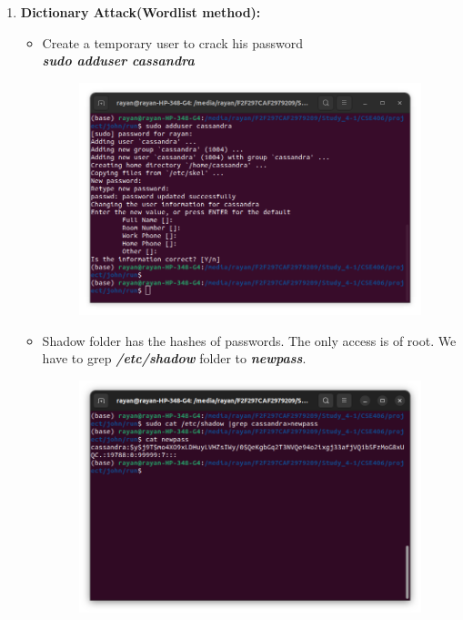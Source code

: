 \documentclass[12pt, A4Paper]{article}
\begin{document}
\begin{enumerate}
    
    \item \textbf{\large{Dictionary Attack(Wordlist method):}}
    \begin{itemize}
        \item Create a temporary user to crack his password \\
        \textbf {\textit{sudo adduser cassandra}}\\ 
         \begin{figure}[H]
            \centering
            \includegraphics[width=\textwidth]{images/word1.png}
        \end{figure}
         \item Shadow folder has the hashes of passwords. The only access is of root. We have to grep \textbf {\textit{/etc/shadow }} folder to \textbf {\textit{newpass}}. \\
         \begin{figure}[H]
            \centering
            \includegraphics[width=\textwidth]{images/word2.png}
        \end{figure}
        

\end{itemize}
\end{enumerate}
\end{document}
